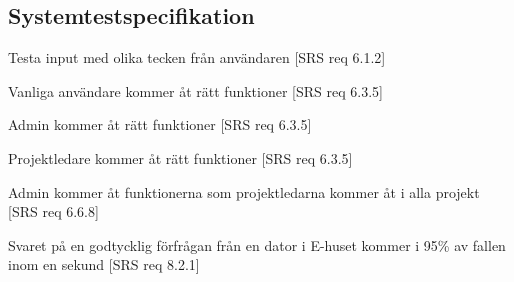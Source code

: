 \documentclass[a4paper]{article}
\begin{document}
\begin{appendices}

\section{Systemtestspecifikation}

\begin{ST}

\item 
Testa input med olika tecken från användaren [SRS req 6.1.2]

\item
Vanliga användare kommer åt rätt funktioner [SRS req 6.3.5]

\item
Admin kommer åt rätt funktioner [SRS req 6.3.5]

\item
Projektledare kommer åt rätt funktioner [SRS req 6.3.5]

\item
Admin kommer åt funktionerna som projektledarna kommer åt i alla projekt [SRS req 6.6.8]

\item
Svaret på en godtycklig förfrågan från en dator i E-huset kommer i 95\% av fallen inom en sekund [SRS req 8.2.1]

\end{ST}






\end{appendices}
\end{document}
